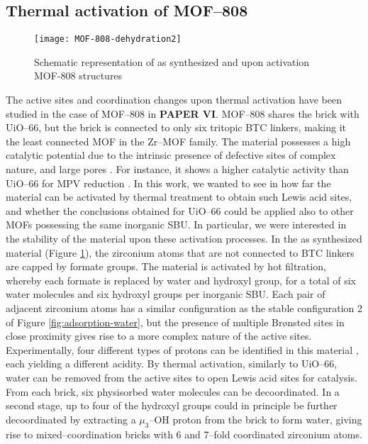 \subsection*{Thermal activation of MOF--808}
\begin{figure}[!htbp]
	\centering
	\texttt{[image: MOF-808-dehydration2]}
	\caption{Schematic representation of as synthesized and upon activation MOF-808 structures}
	\label{fig:MOF-808-dehydration2}
\end{figure}
The active sites and coordination changes upon thermal activation have been studied in the case of MOF--808 in \textbf{PAPER VI}. MOF--808 shares the  brick with UiO--66, but the brick is connected to only six tritopic BTC linkers, making it the least connected MOF in the Zr--MOF family. The material possesses a high catalytic potential due to the intrinsic presence of defective sites of complex nature, and large pores \cite{furukawa2014water}. For instance, it shows a higher catalytic activity than UiO--66 for MPV reduction \cite{plessers2016zr, mautschke2018catalytic}.
\npar
In this work, we wanted to see in how far the material can be activated by thermal treatment to obtain such Lewis acid sites, and whether the conclusions obtained for UiO--66 could be applied also to other MOFs possessing the same inorganic SBU. In particular, we were interested in the stability of the material upon these activation processes.
\npar
In the as synthesized material (Figure \ref{fig:MOF-808-dehydration2}), the zirconium atoms that are not connected to BTC linkers are capped by formate groups. The material is activated by hot filtration, whereby each formate is replaced by water and hydroxyl group, for a total of six water molecules and six hydroxyl groups per inorganic SBU\cite{plessers2016zr, mautschke2018catalytic}. Each pair of adjacent zirconium atoms has a similar configuration as the stable configuration 2 of Figure \ref{fig:adsorption-water}, but the presence of multiple Br\o{}nsted sites in close proximity gives rise to a more complex nature of the active sites. Experimentally, four different types of protons can be identified in this material \cite{klet2016evaluation}, each yielding a different acidity. 
\npar
By thermal activation, similarly to UiO--66, water can be removed from the active sites to open Lewis acid sites for catalysis. From each brick, six physisorbed water molecules can be decoordinated. In a second stage, up to four of the hydroxyl groups could in principle be further decoordinated by extracting a $\mu_3$--OH proton from the brick to form water, giving rise to mixed--coordination bricks with 6 and 7--fold coordinated zirconium atoms.
